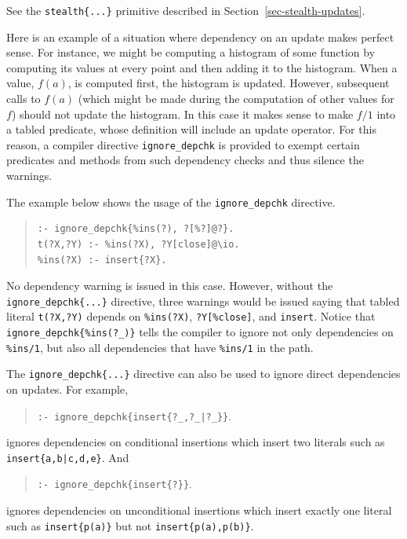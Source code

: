 \documentclass[11pt]{article}
\begin{document}
\ifdef{\isfloraman}{}
{
  See the \texttt{stealth\{...\}} primitive described in
  Section~\ref{sec-stealth-updates}. 
}


\label{page-histogram}
Here is an example of a situation where
dependency on an update makes perfect
sense. For instance, we might be computing a histogram of some function
by computing its values at every point and then adding it to the
histogram. When a value, $f(a)$, is computed first, the histogram is
updated. However, subsequent calls to $f(a)$ (which might be made during
the computation of other values for $f$) should not update the histogram.
In this case it makes sense to make $f/1$ into a tabled predicate, whose
definition will include an update operator. For this reason, a compiler
directive {\tt ignore\_depchk} is provided to exempt certain predicates
and methods from such dependency checks and thus silence the warnings.

The example below shows the usage of the {\tt ignore\_depchk} directive.
\begin{quote}
\begin{verbatim}
:- ignore_depchk{%ins(?), ?[%?]@?}.
t(?X,?Y) :- %ins(?X), ?Y[close]@\io. 
%ins(?X) :- insert{?X}. 
\end{verbatim}
\end{quote}
No dependency warning is issued in this case. However, without the
{\tt ignore\_depchk\{...\}} directive, three warnings would be issued saying that
tabled literal {\tt t(?X,?Y)} depends on {\tt \%ins(?X)}, {\tt ?Y[\%close]},
and {\tt insert}. Notice that {\tt ignore\_depchk\{\%ins(?\_)\}} tells the
compiler to ignore not only dependencies on {\tt \%ins/1}, but also all
dependencies that have {\tt \%ins/1} in the path.

The {\tt ignore\_depchk\{...\}} directive can also be used to ignore direct
dependencies on updates. For example, 
\begin{quote}
{\tt :- ignore\_depchk\{insert\{?\_,?\_|?\_\}\}}.
\end{quote}
\noindent ignores dependencies on conditional insertions which insert
two literals such as {\tt insert\{a,b|c,d,e\}}. And
\begin{quote}
{\tt :- ignore\_depchk\{insert\{?\}\}}.
\end{quote}
\noindent ignores dependencies on unconditional insertions which insert
exactly one literal such as {\tt insert\{p(a)\}} but not {\tt insert\{p(a),p(b)\}}. 
\end{document}
